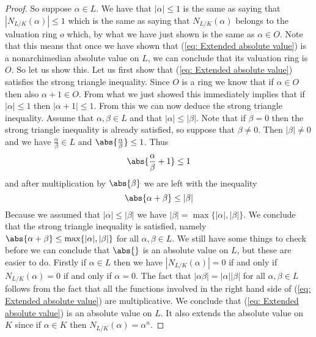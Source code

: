 \documentclass{article}
\begin{document}
\begin{proof}
    So suppose $\alpha \in L$. We have that $|\alpha| \leq 1$ is the same as saying that $|N_{L/K}(\alpha)| \leq 1$ which is the same as saying that $N_{L/K}(\alpha)$ belongs to the valuation ring $o$ which, by what we have just shown is the same as $\alpha \in O$. Note that this means that once we have shown that (\ref{eq: Extended absolute value}) is a nonarchimedian absolute value on $L$, we can conclude that its valuation ring is $O$. So let us show this. Let us first show that (\ref{eq: Extended absolute value}) satisfies the strong triangle inequality. Since $O$ is a ring we know that if $\alpha \in O$ then also $\alpha + 1 \in O$. From what we just showed this immediately implies that if $|\alpha|\leq 1$ then $|\alpha + 1| \leq 1$. From this we can now deduce the strong triangle inequality. Assume that $\alpha, \beta \in L$ and that $|\alpha| \leq |\beta|$. Note that if $\beta = 0$ then the strong triangle inequality is already satisfied, so suppose that $\beta \neq 0$. Then $|\beta| \neq 0$ and we have $\frac{\alpha}{\beta} \in L$ and $\abs{\frac{\alpha}{\beta}} \leq 1$. Thus 
    $$\abs{\frac{\alpha}{\beta} + 1} \leq 1$$ 
    and after multiplication by $\abs {\beta}$ we are left with the inequality
    $$\abs{\alpha + \beta} \leq |\beta|$$
    Because we assumed that $|\alpha| \leq |\beta|$ we have $|\beta| = \max \{|\alpha|,|\beta| \}$. We conclude that the strong triangle inequality is satisfied, namely
    $\abs{\alpha + \beta} \leq \max\{|\alpha|, |\beta|\}$ for all $\alpha, \beta \in L$. We still have some things to check before we can conclude that $\abs{}$ is an absolute value on $L$, but these are easier to do. Firstly if $\alpha \in L$ then we have $|N_{L/K}(\alpha)| = 0$ if and only if $N_{L/K}(\alpha) = 0$ if and only if $\alpha = 0$. The fact that $|\alpha \beta| = |\alpha| |\beta|$ for all $\alpha,\beta \in L$ follows from the fact that all the functions involved in the right hand side of (\ref{eq: Extended absolute value}) are multiplicative. We conclude that (\ref{eq: Extended absolute value}) is an absolute value on $L$. It also extends the absolute value on $K$ since if $\alpha \in K$ then $N_{L/K}(\alpha)= \alpha^n$.


\end{proof}
\end{document}
